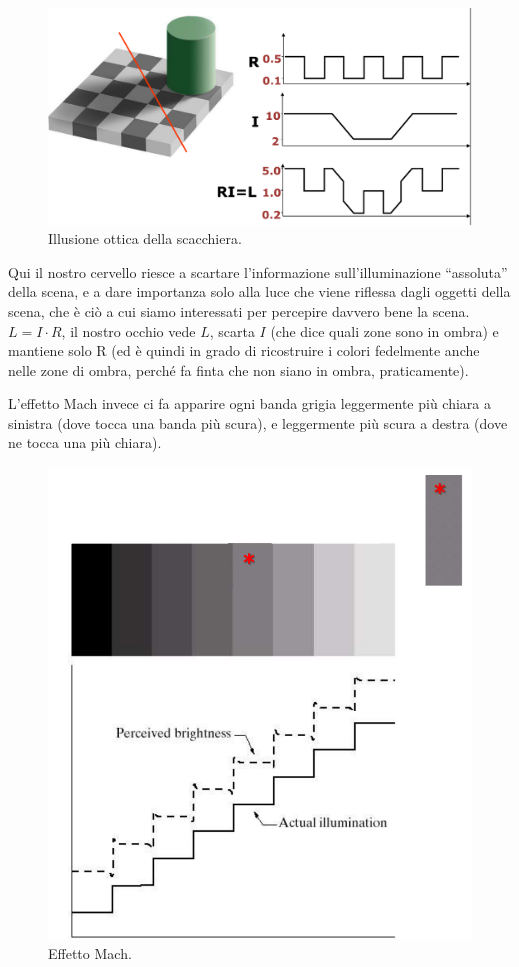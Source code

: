 \documentclass[a4paper,11pt]{article}
\begin{document}
\renewcommand{\thefigure}{2.16}
\begin{figure}[!h]
  \centering
    \includegraphics[scale=0.4]{images/2/chessboard.png}
    \caption{Illusione ottica della scacchiera.}
\end{figure}

Qui il nostro cervello riesce a scartare l'informazione sull'illuminazione ``assoluta'' della scena, e a dare importanza solo alla luce che
viene riflessa dagli oggetti della scena, che è ciò a cui siamo interessati per percepire davvero bene la scena.
$L=I \cdot R$, il nostro occhio vede $L$, scarta $I$ (che dice quali zone sono in ombra) e mantiene solo R (ed è quindi in grado di ricostruire i colori fedelmente anche nelle zone di ombra,
perché fa finta che non siano in ombra, praticamente).
\par
L'effetto Mach invece ci fa apparire ogni banda grigia leggermente più chiara a sinistra (dove tocca una banda più scura), e leggermente più scura a destra (dove ne tocca
una più chiara).

\newpage
\renewcommand{\thefigure}{2.17}
\begin{figure}[!h]
  \centering
    \includegraphics[scale=0.4]{images/2/mach_band.png}
    \caption{Effetto Mach.}
\end{figure}
\end{document}
